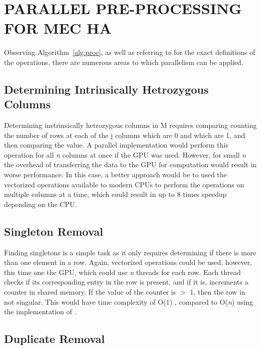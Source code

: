 \documentclass[10pt,twocolumn]{witseiepaper}
\begin{document}

\section{ PARALLEL PRE-PROCESSING FOR MEC HA }

Observing Algorithm~\ref{alg:proc}, as well as referring to \cite{chen:2013} for the exact definitions of the
operations, there are numerous areas to which parallelism can be applied.

\subsection{ Determining Intrinsically Hetrozygous Columns}

Determining instrinsically hetrozygous columns in M requires comparing counting the number of rows at each of
the j columns which are 0 and which are 1, and then comparing the value. A parallel implementation would
perform this operation for all \textit{n} columns at once if the GPU was used. However, for small \textit{n}
the overhead of transferring the data to the GPU for computation would result in worse performance. In this
case, a better approach would be to used the vectorized operations available to modern CPUs to perform the
operations on multiple columns at a time, which could result in up to 8 times speedup depending on the CPU.

\subsection{Singleton Removal}

Finding singletons is a simple task as it only requires determining if there is more than one element in a
row. Again, vectorized operations could be used, however, this time one the GPU, which could use \textit{n}
threads for each row. Each thread checks if its corresponding entry in the row is present, and if it is,
increments a counter in shared memory. If the value of the counter is $>$ 1, then the row in not singular.
This would have time complexity of O(1) , compared to O(\textit{n}) using the implementation of
\cite{chen:2013}.

\subsection{Duplicate Removal}
\end{document}
